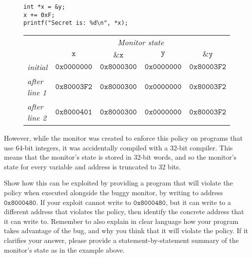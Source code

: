 \documentclass[10pt]{article}
\begin{document}
\begin{enumerate}
\begin{figure}[h]
\begin{minipage}{0.35\textwidth}
\begin{verbatim}
int *x = &y;
x += 0xF;
printf("Secret is: %d\n", *x);
\end{verbatim}
\end{minipage}
\begin{minipage}{0.45\textwidth}
\begin{tabular}{lcccc}
& \multicolumn{4}{c}{\emph{Monitor state}} \\
& $\mathtt{x}$ & $\mathtt{\&x}$ & $\mathtt{y}$ & $\mathtt{\&y}$ \\
\hline
\emph{initial} & $\mathtt{0x0000000}$ & $\mathtt{0x8000300}$ & $\mathtt{0x0000000}$ & $\mathtt{0x80003F2}$ \\
\emph{after line 1} &  $\mathtt{0x80003F2}$ & $\mathtt{0x8000300}$ & $\mathtt{0x0000000}$ & $\mathtt{0x80003F2}$ \\
\emph{after line 2} &  $\mathtt{0x8000401}$ & $\mathtt{0x8000300}$ & $\mathtt{0x0000000}$ & $\mathtt{0x80003F2}$
\end{tabular}
\end{minipage}
\end{figure}

However, while the monitor was created to enforce this policy on programs that use 64-bit integers, it was accidentally compiled with a 32-bit compiler.
This means that the monitor's state is stored in 32-bit words, and so the monitor's state for every variable and address is truncated to 32 bits.

Show how this can be exploited by providing a program that will violate the policy  when executed alongside the buggy monitor, by writing to address $\mathtt{0x8000480}$.
If your exploit cannot write to $\mathtt{0x8000480}$, but it can write to a different address that violates the policy, then identify the concrete address that it can write to.
Remember to also explain in clear language how your program takes advantage of the bug, and why you think that it will violate the policy.
If it clarifies your answer, please provide a statement-by-statement summary of the monitor's state as in the example above.

%
\newpage


\end{enumerate}
\end{document}

